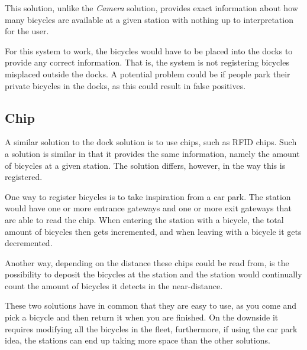 This solution, unlike the \textit{Camera} solution, provides exact information about how many bicycles are available at a given station with nothing up to interpretation for the user.

For this system to work, the bicycles would have to be placed into the docks to provide any correct information.
That is, the system is not registering bicycles misplaced outside the docks.
A potential problem could be if people park their private bicycles in the docks, as this could result in false positives.

\subsection{Chip}
A similar solution to the dock solution is to use chips, such as RFID chips. 
Such a solution is similar in that it provides the same information, namely the amount of bicycles at a given station.
The solution differs, however, in the way this is registered.

One way to register bicycles is to take inspiration from a car park.
The station would have one or more entrance gateways and one or more exit gateways that are able to read the chip.
When entering the station with a bicycle, the total amount of bicycles then gets incremented, and when leaving with a bicycle it gets decremented.

Another way, depending on the distance these chips could be read from, is the possibility to deposit the bicycles at the station and the station would continually count the amount of bicycles it detects in the near-distance.

These two solutions have in common that they are easy to use, as you come and pick a bicycle and then return it when you are finished.
On the downside it requires modifying all the bicycles in the fleet, furthermore, if using the car park idea, the stations can end up taking more space than the other solutions. 

